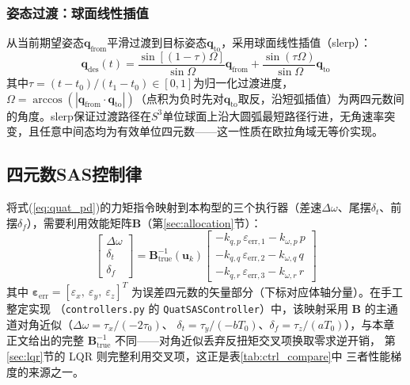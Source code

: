 \subsubsection{姿态过渡：球面线性插值}

从当前期望姿态$\mathbf{q}_{\text{from}}$平滑过渡到目标姿态$\mathbf{q}_{\text{to}}$，采用球面线性插值（slerp）\cite{shoemake1985animating}：
\begin{equation}
    \mathbf{q}_{\text{des}}(t) = \frac{\sin[(1-\tau)\Omega]}{\sin\Omega} \mathbf{q}_{\text{from}} + \frac{\sin(\tau\Omega)}{\sin\Omega} \mathbf{q}_{\text{to}}
    \label{eq:slerp}
\end{equation}
其中$\tau = (t - t_0)/(t_1 - t_0) \in [0,1]$为归一化过渡进度，$\Omega = \arccos(|\mathbf{q}_{\text{from}}\cdot\mathbf{q}_{\text{to}}|)$（点积为负时先对$\mathbf{q}_{\text{to}}$取反，沿短弧插值）为两四元数间的角度。slerp保证过渡路径在$S^3$单位球面上沿大圆弧最短路径行进，无角速率突变，且任意中间态均为有效单位四元数——这一性质在欧拉角域无等价实现。

\subsection{四元数SAS控制律}

将式(\ref{eq:quat_pd})的力矩指令映射到本构型的三个执行器（差速$\Delta\omega$、尾摆$\delta_t$、前摆$\delta_f$），需要利用效能矩阵$\mathbf{B}$（第\ref{sec:allocation}节）：
\begin{equation}
    \begin{bmatrix} \Delta\omega \\ \delta_t \\ \delta_f \end{bmatrix}
    = \mathbf{B}_{\text{true}}^{-1}(\mathbf{u}_k)
    \begin{bmatrix}
        -k_{q,p}\,\varepsilon_{\text{err},1} - k_{\omega,p}\,p \\
        -k_{q,q}\,\varepsilon_{\text{err},2} - k_{\omega,q}\,q \\
        -k_{q,r}\,\varepsilon_{\text{err},3} - k_{\omega,r}\,r
    \end{bmatrix}
    \label{eq:quat_sas_cmd}
\end{equation}
其中 $\boldsymbol{\varepsilon}_{\text{err}} = [\varepsilon_x,\ \varepsilon_y,\ \varepsilon_z]^T$
为误差四元数的矢量部分（下标对应体轴分量）。在手工整定实现
（\texttt{controllers.py} 的 \texttt{QuatSASController}）中，该映射采用
$\mathbf{B}$ 的主通道对角近似（$\Delta\omega=\tau_x/(-2\tau_0)$、
$\delta_t=\tau_y/(-bT_0)$、$\delta_f=\tau_z/(aT_0)$），与本章正文给出的完整
$\mathbf{B}_{\text{true}}^{-1}$ 不同——对角近似丢弃反扭矩交叉项换取零求逆开销，
第\ref{sec:lqr}节的 LQR 则完整利用交叉项，这正是表\ref{tab:ctrl_compare}中
三者性能梯度的来源之一。

